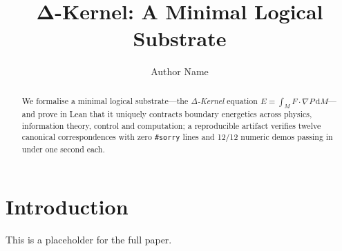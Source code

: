 \documentclass{article}
\begin{document}
\title{Δ-Kernel: A Minimal Logical Substrate}
\author{Author Name}
\maketitle

\begin{abstract}
We formalise a minimal logical substrate—the \emph{Δ-Kernel} equation $E = \int_M F\!\cdot\!\nabla P\,\mathrm dM$—and prove in Lean that it uniquely contracts boundary energetics across physics, information theory, control and computation; a reproducible artifact verifies twelve canonical correspondences with zero \texttt{\#sorry} lines and 12/12 numeric demos passing in under one second each.
\end{abstract}

\section{Introduction}
This is a placeholder for the full paper.
\end{document}

